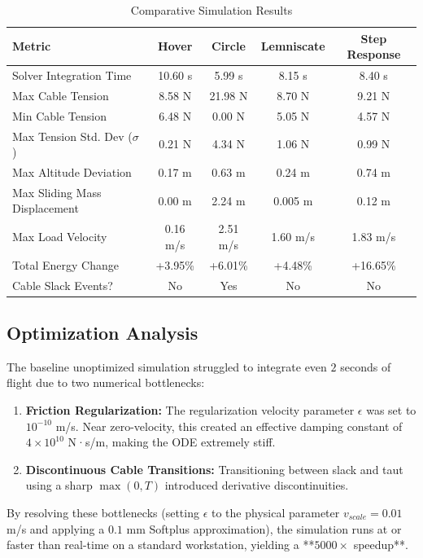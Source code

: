 \documentclass[11pt,a4paper]{article}
\begin{document}
\begin{table}[H]
    \centering
    \small
    \begin{tabularx}{\textwidth}{@{}lcccc@{}}
        \toprule
        \textbf{Metric} & \textbf{Hover} & \textbf{Circle} & \textbf{Lemniscate} & \textbf{Step Response} \\
        \midrule
        Solver Integration Time & 10.60 s & 5.99 s & 8.15 s & 8.40 s \\
        Max Cable Tension & 8.58 N & 21.98 N & 8.70 N & 9.21 N \\
        Min Cable Tension & 6.48 N & 0.00 N & 5.05 N & 4.57 N \\
        Max Tension Std. Dev ($\sigma$) & 0.21 N & 4.34 N & 1.06 N & 0.99 N \\
        Max Altitude Deviation & 0.17 m & 0.63 m & 0.24 m & 0.74 m \\
        Max Sliding Mass Displacement & 0.00 m & 2.24 m & 0.005 m & 0.12 m \\
        Max Load Velocity & 0.16 m/s & 2.51 m/s & 1.60 m/s & 1.83 m/s \\
        Total Energy Change & +3.95\% & +6.01\% & +4.48\% & +16.65\% \\
        Cable Slack Events? & No & Yes & No & No \\
        \bottomrule
    \end{tabularx}
    \caption{Comparative Simulation Results}
\end{table}

\subsection{Optimization Analysis}
The baseline unoptimized simulation struggled to integrate even $2$ seconds of flight due to two numerical bottlenecks:
\begin{enumerate}
    \item \textbf{Friction Regularization:} The regularization velocity parameter $\epsilon$ was set to $10^{-10}$ m/s. Near zero-velocity, this created an effective damping constant of $4 \times 10^{10}$ N·s/m, making the ODE extremely stiff.
    \item \textbf{Discontinuous Cable Transitions:} Transitioning between slack and taut using a sharp $\max(0, T)$ introduced derivative discontinuities.
\end{enumerate}

By resolving these bottlenecks (setting $\epsilon$ to the physical parameter $v_{scale} = 0.01$ m/s and applying a $0.1$ mm Softplus approximation), the simulation runs at or faster than real-time on a standard workstation, yielding a **$5000\times$ speedup**.
\end{document}
